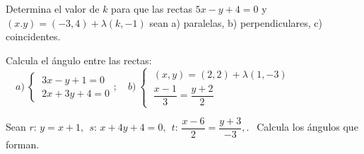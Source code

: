 \vspace{-8mm}
\begin{flushright}
\begin{footnotesize} \textcolor{gris}{}	\end{footnotesize}
\end{flushright}


\begin{mipropuesto}

Determina el valor de $k$ para que las rectas $5x-y+4=0$ y $(x.y)=(-3,4)+\lambda(k,-1)$ sean a) paralelas, b) perpendiculares, c) coincidentes.

\end{mipropuesto}

\vspace{-8mm}
\begin{flushright}
\begin{footnotesize} \textcolor{gris}{}	\end{footnotesize}
\end{flushright}


\begin{mipropuesto}

Calcula el ángulo entre las rectas: $\quad a)\ \begin{cases} \ 3x-y+1=0 \\ \ 2x+3y+4=0 \end{cases};\quad b)\ \begin{cases} \ (x,y)=(2,2)+\lambda(1,-3) \\ \ \dfrac{x-1}{3}=\dfrac{y+2}{2} \end{cases}$

\end{mipropuesto}

\vspace{-8mm}
\begin{flushright}
\begin{footnotesize} \textcolor{gris}{}	\end{footnotesize}
\end{flushright}


\begin{mipropuesto}

Sean $r:\, y=x+1,\ \ s:\, x+4y+4=0,\ \ t:\, \dfrac{x-6}{2}=\dfrac{y+3}{-3}, .\ \ $ Calcula los ángulos que forman.

\end{mipropuesto}

